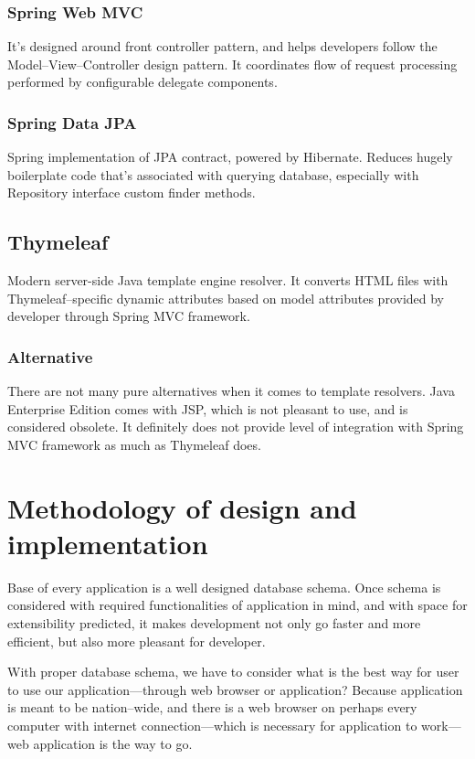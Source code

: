 \documentclass[a4paper,twoside,12pt]{book}
\begin{document}
      \subsubsection{Spring Web MVC}
        It's designed around front controller pattern, and helps developers follow the Model--View--Controller design pattern.
        It coordinates flow of request processing performed by configurable delegate components\cite{bib:spring_web_mvc}.
      
      \subsubsection{Spring Data JPA}
        Spring implementation of JPA contract, powered by Hibernate. Reduces hugely boilerplate code that's associated with querying database,
        especially with Repository interface custom finder methods\cite{bib:spring_data_jpa}.

    \subsection{Thymeleaf}
      Modern server-side Java template engine resolver. 
      It converts HTML files with Thymeleaf--specific dynamic attributes based on model attributes provided by developer through Spring MVC framework\cite{bib:thymeleaf}.
      
      \subsubsection{Alternative}
        There are not many pure alternatives when it comes to template resolvers. 
        Java Enterprise Edition comes with JSP, which is not pleasant to use, and is considered obsolete.
        It definitely does not provide level of integration with Spring MVC framework as much as Thymeleaf does.

  \section{Methodology of design and implementation}
    Base of every application is a well designed database schema. 
    Once schema is considered with required functionalities of application in mind, and with space for extensibility predicted,
    it makes development not only go faster and more efficient, but also more pleasant for developer.

    With proper database schema, we have to consider what is the best way for user to use our application---through web browser or application?
    Because application is meant to be nation--wide, 
    and there is a web browser on perhaps every computer with internet connection---which is necessary for application to work---web application is the way to go.
    
\end{document}
